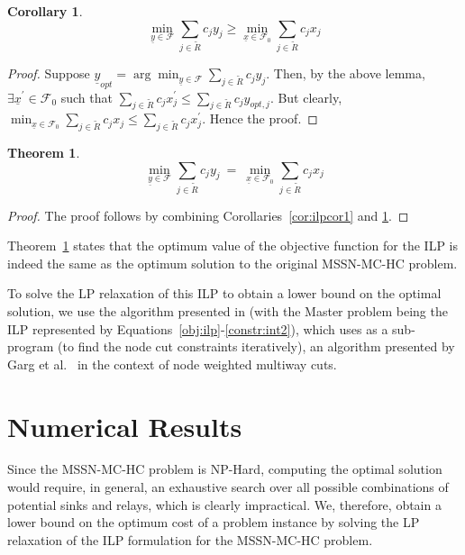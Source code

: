 \documentclass[conference]{IEEEtran}
\newcommand{\Rt}{\tilde{R}}
\newcommand{\F}{\mathcal{F}}
\newtheorem{theorem}{Theorem}
\newtheorem{corollary}{Corollary}
\begin{document}
\begin{corollary}
\label{cor:ilpcor2}
\begin{equation*}
\min_{\underline{y}\in\F}\sum_{j\in \Rt}c_jy_j\geq \min_{\underline{x}\in\F_0}\sum_{j\in \Rt}c_jx_j
\end{equation*}
\end{corollary}

\begin{proof}
Suppose $\underline{y}_{opt}=\arg\min_{\underline{y}\in\F}\sum_{j\in \Rt}c_jy_j$. Then, by the above lemma, $\exists \underline{x}^{'}\in\F_0$ such that $\sum_{j\in \Rt}c_jx^{'}_j\leq \sum_{j\in \Rt}c_jy_{opt,j}$. But clearly, $\min_{\underline{x}\in\F_0}\sum_{j\in \Rt}c_jx_j\leq \sum_{j\in \Rt}c_jx^{'}_j$. Hence the proof.
\end{proof}

\begin{theorem}
\label{thm:ilp-main}
\begin{equation*}
\min_{\underline{y}\in\F}\sum_{j\in \Rt}c_jy_j\:=\:\min_{\underline{x}\in\F_0}\sum_{j\in \Rt}c_jx_j
\end{equation*}
\end{theorem}

\begin{proof}
The proof follows by combining Corollaries~\ref{cor:ilpcor1} and \ref{cor:ilpcor2}.
\end{proof}

Theorem~\ref{thm:ilp-main} states that the optimum value of the objective function for the ILP is indeed the same as the optimum solution to the original MSSN-MC-HC problem.

To solve the LP relaxation of this ILP to obtain a lower bound on the optimal solution, we use the algorithm presented in \cite{nigam} (with the Master problem being the ILP represented by Equations~\eqref{obj:ilp}-\eqref{constr:int2}), which uses as a sub-program (to find the node cut constraints iteratively), an algorithm presented by Garg et al.\ \cite{garg} in the context of node weighted multiway cuts.

\section{Numerical Results} 
\label{sec:results}

Since the MSSN-MC-HC problem is NP-Hard, computing the optimal solution would require, in general, an exhaustive search over all possible combinations of potential sinks and relays, which is clearly impractical. We, therefore, obtain a lower bound on the optimum cost of a problem instance by solving the LP relaxation of the ILP formulation for the MSSN-MC-HC problem. 
\end{document}
